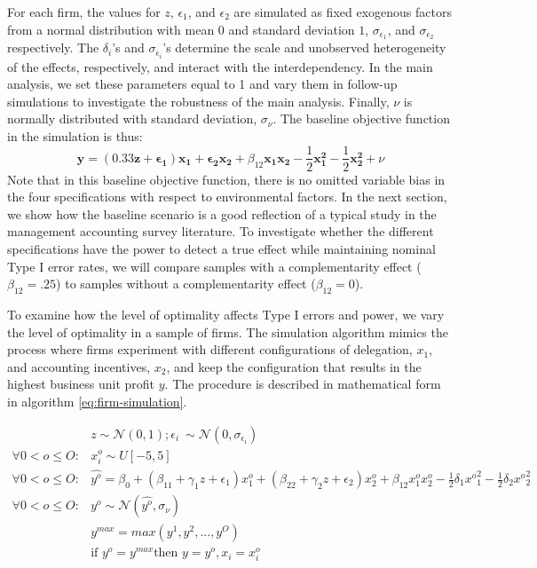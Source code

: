 \documentclass[12pt]{article}
\begin{document}
For each firm, the values for $z$, $\epsilon_1$, and $\epsilon_2$ are simulated as fixed exogenous factors from a normal distribution with mean $0$ and standard deviation $1$,  $\sigma_{\epsilon_1}$, and $\sigma_{\epsilon_2}$ respectively. The $\delta_i$'s and $\sigma_{\epsilon_i}$'s determine the scale and unobserved heterogeneity of the effects, respectively, and interact with the interdependency. In the main analysis, we set these parameters equal to 1 and vary them in follow-up simulations to investigate the robustness of the main analysis. Finally, $\nu$ is normally distributed with standard deviation, $\sigma_{\nu}$. The baseline objective function in the simulation is thus:
\begin{equation}\label{eq:baseline}
\mathbf{y}  = (0.33 \mathbf{z} + \mathbf{\epsilon_1}) \mathbf{x_1} 
						+ \mathbf{\epsilon_2} \mathbf{x_2} 
                        + \beta_{12} \mathbf{x_1} \mathbf{x_2} 
                        - \frac{1}{2}\mathbf{x^2_1} - \frac{1}{2}\mathbf{x^2_2} + \nu
\end{equation}
Note that in this baseline objective function, there is no omitted variable bias in the four specifications with respect to environmental factors. In the next section, we show how the baseline scenario is a good reflection of a typical study in the management accounting survey literature. To investigate whether the different specifications have the power to detect a true effect while maintaining nominal Type I error rates, we will compare samples with a complementarity effect ($\beta_{12} = .25$) to samples without a complementarity effect ($\beta_{12} = 0$).

To examine how the level of optimality affects Type I errors and power, we vary the level of optimality in a sample of firms. The simulation algorithm mimics the process where firms experiment with different configurations of delegation, $x_1$,  and accounting incentives, $x_2$, and keep the configuration that results in the highest business unit profit $y$. The procedure is described in mathematical form in algorithm \eqref{eq:firm-simulation}. 

\begin{equation}\label{eq:firm-simulation}
\begin{aligned}
	&z \sim \mathcal{N}(0, 1); \epsilon_i ~ \sim \mathcal{N}(0, \sigma_{\epsilon_i}) \\
    \forall 0 < o \leq O: &x^o_i \sim U[-5,5] \\
    \forall 0 < o \leq O: &\hat{y^o} = \beta_0 + (\beta_{11} + \gamma_1 z + \epsilon_1) x^o_1 
						+ (\beta_{22} + \gamma_2 z  + \epsilon_2) x^o_2 
                        + \beta_{12} x^o_1 x^o_2 - \frac{1}{2}\delta_1 {x^o}^2_1 - \frac{1}{2}\delta_2 {x^o}^2_2 \\
     \forall 0 < o \leq O: &y^o \sim \mathcal{N}(\hat{y^o}, \sigma_{\nu}) \\
	 &y^{max} = max(y^1, y^2, ..., y^O)  \\
     &\text{if } y^o = y^{max} \text{then } y = y^o, x_i = x^o_i
\end{aligned}
\end{equation}
\end{document}
